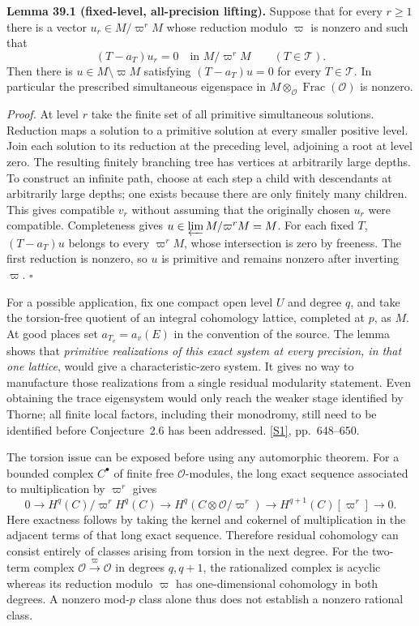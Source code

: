 \documentclass[11pt,a4paper]{article}
\newcommand{\sref}[2]{\hyperlink{source:#1:#2}{[S#2]}}
\numberwithin{equation}{section}
\begin{document}
\textbf{Lemma 39.1 (fixed-level, all-precision lifting).}
Suppose that for every $r\ge1$ there is a vector $u_r\in M/\varpi^rM$ whose
reduction modulo $\varpi$ is nonzero and such that
\[
 (T-a_T)u_r=0\quad\text{in }M/\varpi^rM\qquad(T\in\mathcal T).
\]
Then there is $u\in M\setminus\varpi M$ satisfying $(T-a_T)u=0$ for every
$T\in\mathcal T$. In particular the prescribed simultaneous eigenspace in
$M\otimes_{\mathcal O}\operatorname{Frac}(\mathcal O)$ is nonzero.

\emph{Proof.}
At level $r$ take the finite set of all primitive simultaneous solutions.
Reduction maps a solution to a primitive solution at every smaller positive
level. Join each solution to its reduction at the preceding level, adjoining
a root at level zero. The resulting finitely branching tree has vertices at
arbitrarily large depths. To construct an infinite path, choose at each step
a child with descendants at arbitrarily large depths; one exists because
there are only finitely many children. This gives compatible $v_r$ without
assuming that the originally chosen $u_r$ were compatible. Completeness gives
$u\in\varprojlim M/\varpi^rM=M$. For each fixed $T$, $(T-a_T)u$ belongs to
every $\varpi^rM$, whose intersection is zero by freeness. The first reduction
is nonzero, so $u$ is primitive and remains nonzero after inverting $\varpi$.
\hfill$\square$

For a possible application, fix one compact open level $U$ and degree $q$,
and take the torsion-free quotient of an integral cohomology lattice, completed
at $p$, as $M$. At good places set $a_{T_v}=a_v(E)$ in the convention of the
source. The lemma shows that \emph{primitive realizations of this exact system
at every precision, in that one lattice}, would give a characteristic-zero
system. It gives no way to manufacture those realizations from a single
residual modularity statement. Even obtaining the trace eigensystem would
only reach the weaker stage identified by Thorne; all finite local factors,
including their monodromy, still need to be identified before Conjecture~2.6
has been addressed. \sref{30006690}{1}, pp.~648--650.

The torsion issue can be exposed before using any automorphic theorem. For a
bounded complex $C^\bullet$ of finite free $\mathcal O$-modules, the long exact
sequence associated to multiplication by $\varpi^r$ gives
\[
0\longrightarrow H^q(C)/\varpi^rH^q(C)
\longrightarrow H^q(C\otimes\mathcal O/\varpi^r)
\longrightarrow H^{q+1}(C)[\varpi^r]\longrightarrow0.
\]
Here exactness follows by taking the kernel and cokernel of multiplication in
the adjacent terms of that long exact sequence. Therefore residual cohomology
can consist entirely of classes arising from torsion in the next degree.
For the two-term complex $\mathcal O\xrightarrow{\varpi}\mathcal O$ in degrees
$q,q+1$, the rationalized complex is acyclic whereas its reduction modulo
$\varpi$ has one-dimensional cohomology in both degrees. A nonzero mod-$p$
class alone thus does not establish a nonzero rational class.
\end{document}
